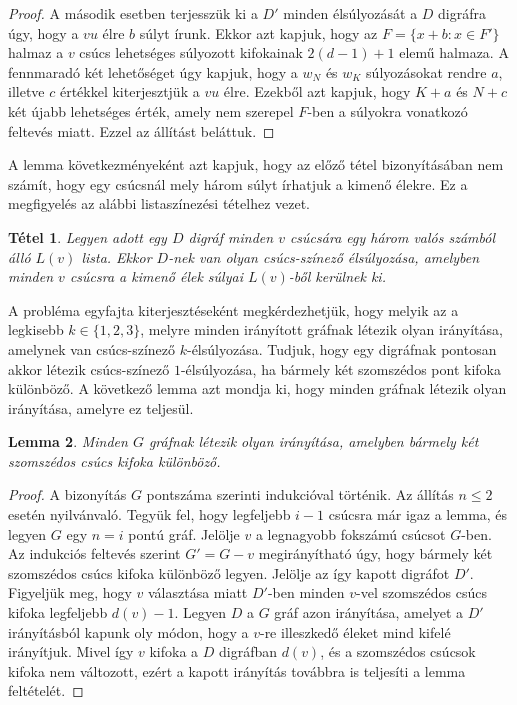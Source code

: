 \documentclass[12pt, a4paper]{report}
\newtheorem{tét}{Tétel}[section]
\newtheorem{lem}[tét]{Lemma}
\theoremstyle{remark}
\theoremstyle{definition}
\begin{document}
\begin{proof}
A második esetben terjesszük ki a $D'$ minden élsúlyozását a $D$ digráfra úgy, hogy a $vu$ élre $b$ súlyt írunk. Ekkor azt kapjuk, hogy az $F = \lbrace x + b: x \in F' \rbrace$ halmaz a $v$ csúcs lehetséges súlyozott kifokainak $2(d - 1) + 1$ elemű halmaza. A fennmaradó két lehetőséget úgy kapjuk, hogy a $w_N$ és $w_K$ súlyozásokat rendre $a$, illetve $c$ értékkel kiterjesztjük a $vu$ élre. Ezekből azt kapjuk, hogy $K + a$ és $N + c$ két újabb lehetséges érték, amely nem szerepel $F$-ben a súlyokra vonatkozó feltevés miatt. Ezzel az állítást beláttuk.
\end{proof}

A lemma következményeként azt kapjuk, hogy az előző tétel bizonyításában nem számít, hogy egy csúcsnál mely három súlyt írhatjuk a kimenő élekre. Ez a megfigyelés az alábbi listaszínezési tételhez vezet.

\begin{tét}
Legyen adott egy $D$ digráf minden $v$ csúcsára egy három valós számból álló $L(v)$ lista. Ekkor $D$-nek van olyan csúcs-színező élsúlyozása, amelyben minden $v$ csúcsra a kimenő élek súlyai $L(v)$-ből kerülnek ki.
\end{tét}

A probléma egyfajta kiterjesztéseként megkérdezhetjük, hogy melyik az a legkisebb $k \in \lbrace 1, 2, 3 \rbrace$, melyre minden irányított gráfnak létezik olyan irányítása, amelynek van csúcs-színező $k$-élsúlyozása. Tudjuk, hogy egy digráfnak pontosan akkor létezik csúcs-színező $1$-élsúlyozása, ha bármely két szomszédos pont kifoka különböző. A következő lemma azt mondja ki, hogy minden gráfnak létezik olyan irányítása, amelyre ez teljesül.

\begin{lem}
Minden $G$ gráfnak létezik olyan irányítása, amelyben bármely két szomszédos csúcs kifoka különböző.
\end{lem}

\begin{proof}
A bizonyítás $G$ pontszáma szerinti indukcióval történik. Az állítás $n \leq 2$ esetén nyilvánvaló. Tegyük fel, hogy legfeljebb $i - 1$ csúcsra már igaz a lemma, és legyen $G$ egy $n = i$ pontú gráf. Jelölje $v$ a legnagyobb fokszámú csúcsot $G$-ben. Az indukciós feltevés szerint $G' = G - v$ megirányítható úgy, hogy bármely két szomszédos csúcs kifoka különböző legyen. Jelölje az így kapott digráfot $D'$. Figyeljük meg, hogy $v$ választása miatt $D'$-ben minden $v$-vel szomszédos csúcs kifoka legfeljebb $d(v) - 1$. Legyen $D$ a $G$ gráf azon irányítása, amelyet a $D'$ irányításból kapunk oly módon, hogy a $v$-re illeszkedő éleket mind kifelé irányítjuk. Mivel így $v$ kifoka a $D$ digráfban $d(v)$, és a szomszédos csúcsok kifoka nem változott, ezért a kapott irányítás továbbra is teljesíti a lemma feltételét.
\end{proof}
\end{document}
